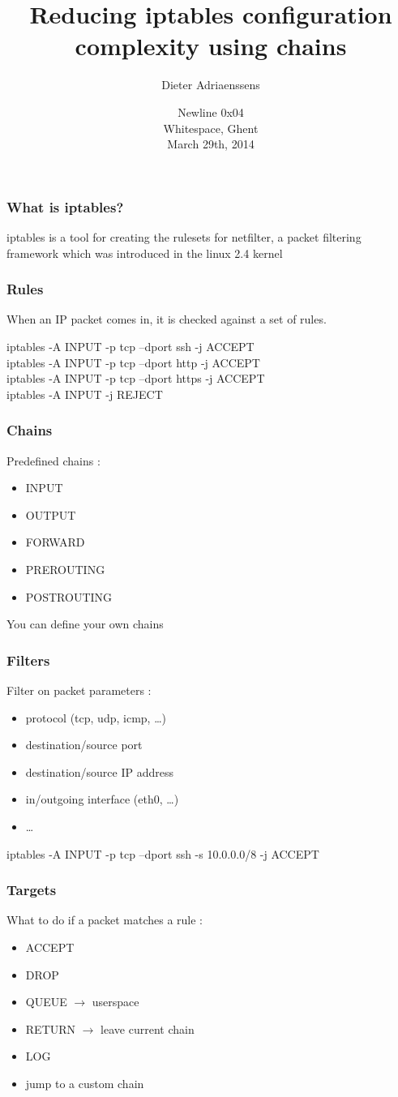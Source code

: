 \documentclass[14pt]{beamer}
\title[Reduce iptables config complexity]{Reducing iptables configuration complexity using chains}
\author{Dieter Adriaenssens}
\date[29Mar2014]{Newline 0x04\\
Whitespace, Ghent\\
March 29th, 2014}
\begin{document}
  \begin{frame}
  \titlepage
  \end{frame}
  \begin{frame}
    \frametitle{What is iptables?}
    iptables is a tool for creating the rulesets for netfilter, a packet filtering framework which was introduced in the linux 2.4 kernel
  \end{frame}
  \begin{frame}
    \frametitle{Rules}
    When an IP packet comes in, it is checked against a set of rules.
    \begin{example}
      \small{iptables -A INPUT -p tcp --dport ssh -j ACCEPT\\
      iptables -A INPUT -p tcp --dport http -j ACCEPT\\
      iptables -A INPUT -p tcp --dport https -j ACCEPT\\
      iptables -A INPUT -j REJECT}
    \end{example}
  \end{frame}
  \begin{frame}
    \frametitle{Chains}
    Predefined chains :
    \begin{itemize}
      \item INPUT
      \item OUTPUT
      \item FORWARD
      \item PREROUTING
      \item POSTROUTING
    \end{itemize}
    You can define your own chains
  \end{frame}
  \begin{frame}
    \frametitle{Filters}
    Filter on packet parameters :
    \begin{itemize}
      \item protocol (tcp, udp, icmp, \ldots)
      \item destination/source port
      \item destination/source IP address
      \item in/outgoing interface (eth0, \ldots)
      \item \ldots
    \end{itemize}
    \begin{example}
      \small{iptables -A INPUT -p tcp --dport ssh -s 10.0.0.0/8 -j ACCEPT}
    \end{example}
  \end{frame}
  \begin{frame}
    \frametitle{Targets}
    What to do if a packet matches a rule :
    \begin{itemize}
      \item ACCEPT
      \item DROP
      \item QUEUE $\rightarrow$ userspace
      \item RETURN $\rightarrow$ leave current chain
      \item LOG
      \item jump to a custom chain
    \end{itemize}
  \end{frame}
\end{document}
